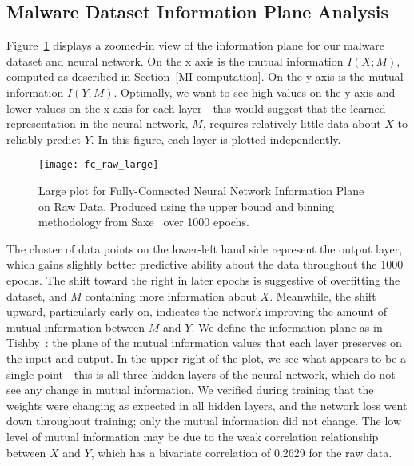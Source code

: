 \subsection{Malware Dataset Information Plane Analysis}\label{infoplane}
Figure~\ref{fig:infoplane example} displays a zoomed-in view of the information plane for our malware dataset and neural network.
On the x axis is the mutual information $I(X;M)$, computed as described in Section~\ref{MI computation}.
On the y axis is the mutual information $I(Y;M)$. 
Optimally, we want to see high values on the y axis and lower values on the x axis for each layer - this would suggest that the learned representation in the neural network, $M$, requires relatively little data about $X$ to reliably predict $Y$.
In this figure, each layer is plotted independently. 

\begin{figure}[h!]
\begin{center}
\texttt{[image: fc\_raw\_large]}
\caption{Large plot for Fully-Connected Neural Network Information Plane on Raw Data. Produced using the upper bound and binning methodology from Saxe~\cite{saxe2019information} over 1000 epochs.}
\label{fig:infoplane example}
\centering
\end{center}
\end{figure}

The cluster of data points on the lower-left hand side represent the output layer, which gains slightly better predictive ability about the data throughout the 1000 epochs. 
The shift toward the right in later epochs is suggestive of overfitting the dataset, and $M$ containing more information about $X$.
Meanwhile, the shift upward, particularly early on, indicates the network improving the amount of mutual information between $M$ and $Y$.
We define the information plane as in Tishby~\cite{tishby2015deep}: the plane of the mutual information values that each layer preserves on the input and output.
In the upper right of the plot, we see what appears to be a single point - this is all three hidden layers of the neural network, which do not see any change in mutual information.
We verified during training that the weights were changing as expected in all hidden layers, and the network loss went down throughout training; only the mutual information did not change.
The low level of mutual information may be due to the weak correlation relationship between $X$ and $Y$, which has a bivariate correlation of 0.2629 for the raw data.

